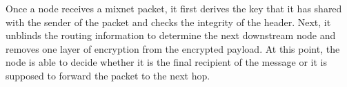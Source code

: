 Once a node receives a mixnet packet, it first derives the key that it has shared with the sender of the packet and checks the integrity of the header. Next, it unblinds the routing information to determine the next downstream node and removes one layer of encryption from the encrypted payload. At this point, the node is able to decide whether it is the final recipient of the message or it is supposed to forward the packet to the next hop.

\begin{comment}
\paragraph{Notation:}Let $\kappa=128$ be the security parameter. With non-negligible probability, an adversary must perform around $2^\kappa$ operations to break the security of Sphinx.

Let $r$ be the maximum number of nodes that a Sphinx mix message will traverse before being delivered to its destination.

$G$ is a prime order cyclic group satisfying the decisional Diffie-Hellman assumption \cite{Boneh_1998}. We use the secp256k1 elliptic curve \cite{secp}. The element $g$ is a generator of $G$ and $q$ is the (prime) order of $G$, with $q\approx2^{2*\kappa}$.

$G^*$ is the set of non-identity elements of G. $h_b$ is a pre-image resistant hash function used to compute blinding factors and modelled as a random oracle such that
$h_b:G^*\times G^*\rightarrow\mathbb{Z}^*_q$, where $\mathbb{Z}^*_q$ is the field of non-identity elements of $\mathbb{Z}_q$ (field of integers). We use the BLAKE2s hash function \cite{blake2}.

Each node $i$ has a private key $x_{i}\in \mathbb{Z}^*_q$ and a public key $y_{i}=g^{x_{i}}\in G^*$.
$\alpha_i$ is the group elements which, when combined with the nodes’ public keys, allow a shared key to be computed for each via Diffie-Hellman (DH) key exchange. This ensures that each node in the user-chosen route can forward the packet to the next, and only the receiving mix node can decrypt it.
$s_i$ are the DH shared secrets, $b_i$ are the blinding factors.
\end{comment}








